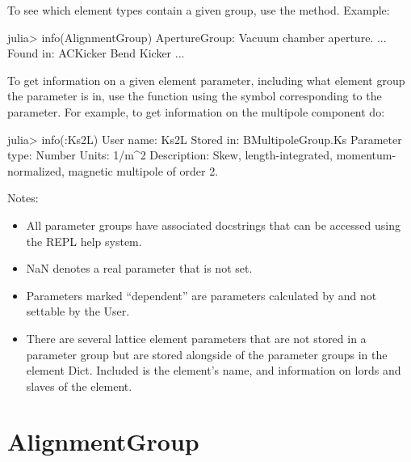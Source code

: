 \newpage


To see which element types contain a given group, use the 
method. Example:
\begin{example}
  julia> info(AlignmentGroup)
  ApertureGroup: Vacuum chamber aperture.
  ...
  Found in:
    ACKicker
    Bend
    Kicker
    ...
\end{example}

To get information on a given element parameter, including what element group the parameter is in,
use the  function using the symbol corresponding to the parameter. For example,
to get information on the multipole component  do:
\begin{example}
  julia> info(:Ks2L)
    User name:       Ks2L
    Stored in:       BMultipoleGroup.Ks
    Parameter type:  Number
    Units:           1/m^2
    Description:     Skew, length-integrated, momentum-normalized, 
                                          magnetic multipole of order 2.
\end{example}
  
Notes:
\begin{itemize}
%
\item
All parameter groups have associated docstrings that can be accessed using the REPL help system.
%
\item
NaN denotes a real parameter that is not set.
%
\item
Parameters marked ``dependent'' are parameters calculated by \accellat and not settable by the User.
%
\item
There are several lattice element parameters that are not stored in a parameter group but are stored
alongside of the parameter groups in the element Dict. Included is the element's name, and information
on lords and slaves of the element.
%
\end{itemize}

\newpage

\section{AlignmentGroup}
\label{s:alignment.g}

